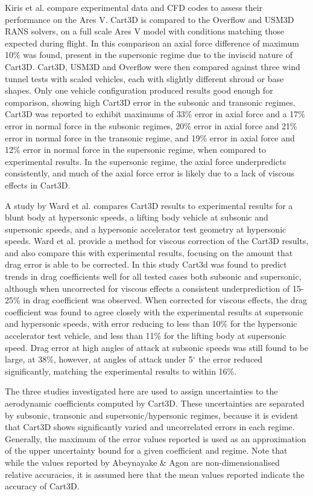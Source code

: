 Kiris et al. compare experimental data and CFD codes to assess their performance on the Ares V\cite{Kiris2011}. Cart3D is compared to the Overflow and USM3D RANS solvers, on a full scale Ares V model with conditions matching those expected during flight. In this comparison an axial force difference of maximum 10\% was found, present in the supersonic regime due to the inviscid nature of Cart3D\cite{Kiris2011}. Cart3D, USM3D and Overflow were then compared against three wind tunnel tests with scaled vehicles, each with slightly different shroud or base shapes. Only one vehicle configuration produced results good enough for comparison\cite{Kiris2011}, showing high Cart3D error in the subsonic and transonic regimes. Cart3D was reported to exhibit maximums of 33\% error in axial force and a 17\% error in normal force in the subsonic regimes, 20\% error in axial force and 21\% error in normal force in the transonic regime, and 19\% error in axial force and 12\% error in normal force in the supersonic regime, when compared to experimental results. In the supersonic regime, the axial force underpredicts consistently, and much of the axial force error is likely due to a lack of viscous effects in Cart3D. 

A study by Ward et al.\cite{Ward2018} compares Cart3D results to experimental results for a blunt body at hypersonic speeds, a lifting body vehicle at subsonic and supersonic speeds, and a hypersonic accelerator test geometry at hypersonic speeds. Ward et al. provide a method for viscous correction of the Cart3D results, and also compare this with experimental results, focusing on the amount that drag error is able to be corrected. In this study Cart3d was found to predict trends in drag coefficients well for all tested cases both subsonic and supersonic, although when uncorrected for viscous effects a consistent underprediction of 15-25\% in drag coefficient was observed\cite{Ward2018}. When corrected for viscous effects, the drag coefficient was found to agree closely with the experimental results at supersonic and hypersonic speeds, with error reducing to less than 10\% for the hypersonic accelerator test vehicle, and less than 11\% for the lifting body at supersonic speed\cite{Ward2018}. Drag error at high angles of attack at subsonic speeds was still found to be large, at 38\%, however, at angles of attack under 5$^\circ$ the error reduced significantly, matching the experimental results to within 16\%. 


The three studies investigated here are used to assign uncertainties to the aerodynamic coefficients computed by Cart3D. These uncertainties are separated by subsonic, transonic and supersonic/hypersonic regimes, because it is evident that Cart3D shows significantly varied and uncorrelated errors in each regime. Generally, the maximum of the error values reported is used as an approximation of the upper uncertainty bound for a given coefficient and regime. 
  Note that while the values reported by Abeynayake \& Agon\cite{Abeynayake2013a} are non-dimensionalised relative accuracies, it is assumed here that the mean values reported indicate the accuracy of Cart3D. 
  
